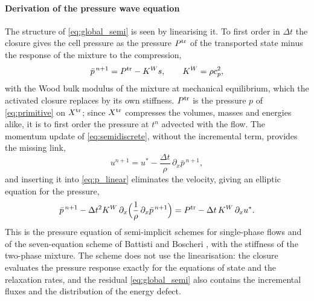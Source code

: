 \paragraph{Derivation of the pressure wave equation}
The structure of \eqref{eq:global_semi} is seen by linearising it. To first order in $\Delta t$ the closure gives the cell
pressure as the pressure $P^{\rm tr}$ of the transported state minus the response of the mixture to the compression,
\begin{equation}
\bar p^{\,n+1}=P^{\rm tr}-K^W s,\qquad K^W=\rho c_p^2 ,
\label{eq:p_linear}
\end{equation}
with the Wood bulk modulus of the mixture at mechanical equilibrium, which the activated closure replaces by its own
stiffness. $P^{\rm tr}$ is the pressure $p$ of \eqref{eq:primitive} on $X^{\rm tr}$; since $X^{\rm tr}$ compresses the volumes,
masses and energies alike, it is to first order the pressure at $t^n$ advected with the flow. The momentum update of \eqref{eq:semidiscrete}, without the incremental term, provides the missing link,
\begin{equation}
u^{n+1}=u^*-\frac{\Delta t}{\rho}\,\partial_x\bar p^{\,n+1},
\label{eq:u_update}
\end{equation}
and inserting it into \eqref{eq:p_linear} eliminates the velocity, giving an elliptic equation for the pressure,
\begin{equation}
\bar p^{\,n+1}-\Delta t^2K^W\,\partial_x\Big(\frac1\rho\,\partial_x\bar p^{\,n+1}\Big)=P^{\rm tr}-\Delta t\,K^W\,\partial_xu^* .
\label{eq:wave}
\end{equation}
This is the pressure equation of semi-implicit schemes for single-phase flows \cite{DumbserCasulli2016,BoscheriPareschi2021} and of
the seven-equation scheme of Battisti and Boscheri \cite{BattistiBoscheri2025}, with the stiffness of the two-phase mixture. The scheme does not
use the linearisation: the closure evaluates the pressure response exactly for the equations of state and the relaxation
rates, and the residual \eqref{eq:global_semi} also contains the incremental fluxes and the distribution of the energy
defect.

